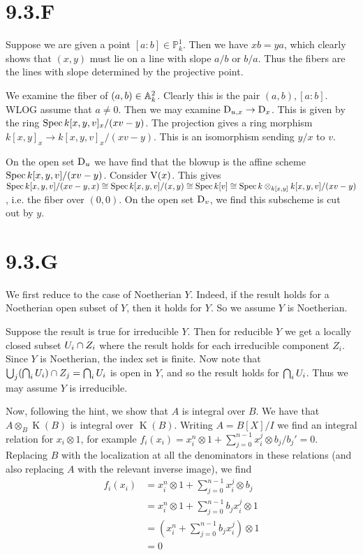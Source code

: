 \documentclass{article}
\begin{document}
\section{9.3.F}
Suppose we are given a point $[a : b] \in \mathbb{P}^1_k$. Then we have
$xb=ya$, which clearly shows that $(x, y)$ must
lie on a line with slope $a/b$ or $b/a$.
Thus the fibers are the lines with slope determined by the projective point.

We examine the fiber of $(a, b) \in \mathbb{A}^2_k$. Clearly this is the pair
$(a,b), [a : b]$. WLOG assume that $a \neq 0$. Then we may
examine $\operatorname{D}_{u, x} \to \operatorname{D}_x$. This is given by the ring
$\operatorname{Spec} k[x, y, v]_x/(xv-y)$. The projection gives a ring morphism
$k[x, y]_x \to k[x, y, v]_x/(xv-y)$. This is an isomorphism sending $y/x$
to $v$.

On the open set $\operatorname{D}_u$ we have find that the blowup is the
affine scheme $\operatorname{Spec} k[x, y, v]/(xv-y)$. Consider $\operatorname{V}(x)$. This
gives $\operatorname{Spec} k[x, y, v]/(xv-y,x) \cong \operatorname{Spec}
    k[x, y, v]/(x, y) \cong \operatorname{Spec}
    k[v] \cong \operatorname{Spec} k \otimes_{k[x, y]}
    k[x,y,v]/(xv-y)$, i.e. the fiber over $(0, 0)$. On
the open set $\operatorname{D}_v$, we find this subscheme is cut out by
$y$.

\section{9.3.G}
We first reduce to the case of Noetherian $Y$. Indeed, if
the result holds for a Noetherian open subset of $Y$, then
it holds for $Y$. So we assume $Y$ is
Noetherian.

Suppose the result is true for irreducible $Y$. Then for
reducible $Y$ we get a locally closed subset
$U_i \cap Z_i$ where the result holds for each irreducible component
$Z_i$. Since $Y$ is Noetherian, the index
set is finite. Now note that $\bigcup_j (\bigcap_i U_i) \cap Z_j = \bigcap_i U_i$ is open in
$Y$, and so the result holds for $\bigcap_i U_i$.
Thus we may assume $Y$ is irreducible.

Now, following the hint, we show that $A$ is integral over
$B$. We have that $A \otimes_B \operatorname{K}(B)$ is integral over
$\operatorname{K}(B)$. Writing $A=B[X]/I$ we find an integral
relation for $x_i \otimes 1$, for example $f_i(x_i)=x_i^n \otimes 1+\sum_{j=0}^{n-1} x_i^j \otimes b_j/b_j'=0$.
Replacing $B$ with the localization at all the denominators
in these relations (and also replacing $A$ with the
relevant inverse image), we find
\begin{align*}
    f_i(x_i) & =x_i^n \otimes 1+\sum_{j=0}^{n-1} x_i^j \otimes b_j  \\
             & =x_i^n \otimes 1+\sum_{j=0}^{n-1} b_jx_i^j \otimes 1 \\
             & = (x_i^n+\sum_{j=0}^{n-1} b_jx_i^j) \otimes 1        \\
             & =0
\end{align*}
\end{document}
